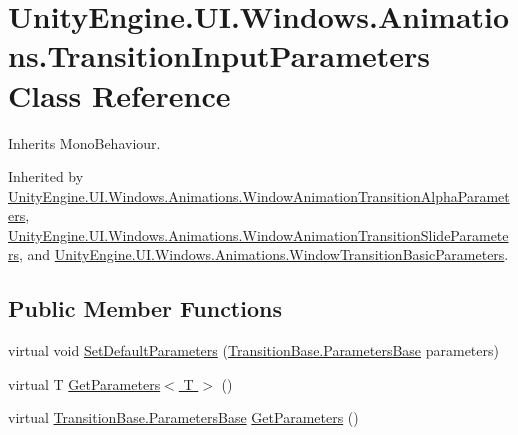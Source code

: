 \hypertarget{class_unity_engine_1_1_u_i_1_1_windows_1_1_animations_1_1_transition_input_parameters}{}\section{Unity\+Engine.\+U\+I.\+Windows.\+Animations.\+Transition\+Input\+Parameters Class Reference}
\label{class_unity_engine_1_1_u_i_1_1_windows_1_1_animations_1_1_transition_input_parameters}


Inherits Mono\+Behaviour.



Inherited by \hyperlink{class_unity_engine_1_1_u_i_1_1_windows_1_1_animations_1_1_window_animation_transition_alpha_parameters}{Unity\+Engine.\+U\+I.\+Windows.\+Animations.\+Window\+Animation\+Transition\+Alpha\+Parameters}, \hyperlink{class_unity_engine_1_1_u_i_1_1_windows_1_1_animations_1_1_window_animation_transition_slide_parameters}{Unity\+Engine.\+U\+I.\+Windows.\+Animations.\+Window\+Animation\+Transition\+Slide\+Parameters}, and \hyperlink{class_unity_engine_1_1_u_i_1_1_windows_1_1_animations_1_1_window_transition_basic_parameters}{Unity\+Engine.\+U\+I.\+Windows.\+Animations.\+Window\+Transition\+Basic\+Parameters}.

\subsection*{Public Member Functions}
\begin{DoxyCompactItemize}
\item 
virtual void \hyperlink{class_unity_engine_1_1_u_i_1_1_windows_1_1_animations_1_1_transition_input_parameters_a350a48f62149d808d28876fe54c785ca}{Set\+Default\+Parameters} (\hyperlink{class_unity_engine_1_1_u_i_1_1_windows_1_1_animations_1_1_transition_base_1_1_parameters_base}{Transition\+Base.\+Parameters\+Base} parameters)
\item 
virtual T \hyperlink{class_unity_engine_1_1_u_i_1_1_windows_1_1_animations_1_1_transition_input_parameters_ac3adabb362ded69087a03033c9588190}{Get\+Parameters$<$ T $>$} ()
\item 
virtual \hyperlink{class_unity_engine_1_1_u_i_1_1_windows_1_1_animations_1_1_transition_base_1_1_parameters_base}{Transition\+Base.\+Parameters\+Base} \hyperlink{class_unity_engine_1_1_u_i_1_1_windows_1_1_animations_1_1_transition_input_parameters_ad29ff74f3332df0d304ad011fa83961b}{Get\+Parameters} ()
\end{DoxyCompactItemize}
